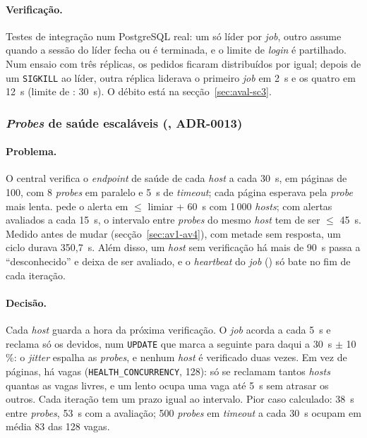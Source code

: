 \paragraph{Verificação.}
Testes de integração num PostgreSQL real: um só líder por \emph{job}, outro assume quando a sessão do líder fecha
ou é terminada, e o limite de \emph{login} é partilhado. Num ensaio com três réplicas, os pedidos ficaram
distribuídos por igual; depois de um \texttt{SIGKILL} ao líder, outra réplica liderava o primeiro \emph{job} em
2~s e os quatro em 12~s (limite de : 30~s). O débito está na secção~\ref{sec:aval-sc3}.

\subsubsection{\emph{Probes} de saúde escaláveis (, ADR-0013)}
\label{sec:d7}

\paragraph{Problema.}
O central verifica o \emph{endpoint} de saúde de cada \emph{host} a cada 30~s, em páginas de 100, com 8
\emph{probes} em paralelo e 5~s de \emph{timeout}; cada página esperava pela \emph{probe} mais lenta.  pede
o alerta em $\le$ limiar + 60~s com 1\,000 \emph{hosts}; com alertas avaliados a cada 15~s, o intervalo entre
\emph{probes} do mesmo \emph{host} tem de ser $\le$ 45~s. Medido antes de mudar (secção~\ref{sec:av1-av4}), com
metade sem resposta, um ciclo durava 350,7~s. Além disso, um \emph{host} sem verificação há mais de 90~s passa a
``desconhecido'' e deixa de ser avaliado, e o \emph{heartbeat} do \emph{job} () só bate no fim de cada
iteração.

\paragraph{Decisão.}
Cada \emph{host} guarda a hora da próxima verificação. O \emph{job} acorda a cada 5~s e reclama só os devidos, num
\texttt{UPDATE} que marca a seguinte para daqui a 30~s $\pm$ 10\,\%: o \emph{jitter} espalha as \emph{probes}, e
nenhum \emph{host} é verificado duas vezes. Em vez de páginas, há vagas (\texttt{HEALTH\_CONCURRENCY}, 128): só se
reclamam tantos \emph{hosts} quantas as vagas livres, e um lento ocupa uma vaga até 5~s sem atrasar os outros. Cada
iteração tem um prazo igual ao intervalo. Pior caso calculado: 38~s entre \emph{probes}, 53~s com a avaliação; 500
\emph{probes} em \emph{timeout} a cada 30~s ocupam em média 83 das 128 vagas.

